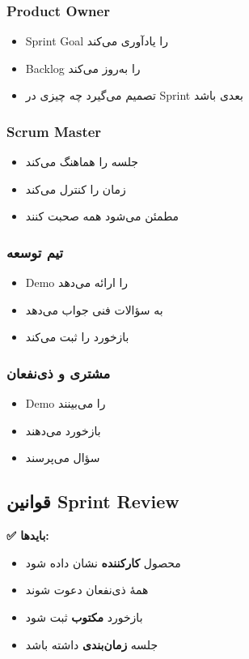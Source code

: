 \documentclass[12pt, a4paper]{article}
\begin{document}
\subsubsection{Product Owner}
\begin{itemize}
    \item Sprint Goal را یادآوری می‌کند
    \item Backlog را به‌روز می‌کند
    \item تصمیم می‌گیرد چه چیزی در Sprint بعدی باشد
\end{itemize}

\subsubsection{Scrum Master}
\begin{itemize}
    \item جلسه را هماهنگ می‌کند
    \item زمان را کنترل می‌کند
    \item مطمئن می‌شود همه صحبت کنند
\end{itemize}

\subsubsection{تیم توسعه}
\begin{itemize}
    \item Demo را ارائه می‌دهد
    \item به سؤالات فنی جواب می‌دهد
    \item بازخورد را ثبت می‌کند
\end{itemize}

\subsubsection{مشتری و ذی‌نفعان}
\begin{itemize}
    \item Demo را می‌بینند
    \item بازخورد می‌دهند
    \item سؤال می‌پرسند
\end{itemize}

\subsection{قوانین Sprint Review}

\textbf{✅ بایدها:}
\begin{itemize}
    \item محصول \textbf{کارکننده} نشان داده شود
    \item همهٔ ذی‌نفعان دعوت شوند
    \item بازخورد \textbf{مکتوب} ثبت شود
    \item جلسه \textbf{زمان‌بندی} داشته باشد
\end{itemize}
\end{document}
